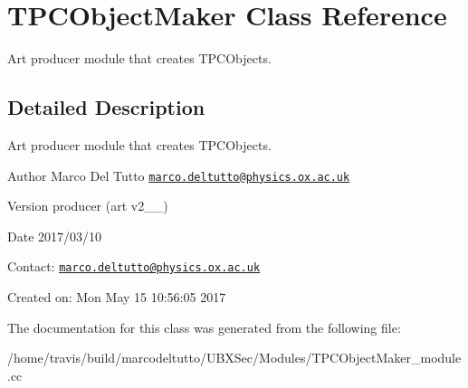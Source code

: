 \hypertarget{classTPCObjectMaker}{\section{T\-P\-C\-Object\-Maker Class Reference}
\label{classTPCObjectMaker}
}


Art producer module that creates T\-P\-C\-Objects.  




\subsection{Detailed Description}
Art producer module that creates T\-P\-C\-Objects. 

\begin{DoxyAuthor}{Author}
Marco Del Tutto \href{mailto:marco.deltutto@physics.ox.ac.uk}{\tt marco.\-deltutto@physics.\-ox.\-ac.\-uk}
\end{DoxyAuthor}
\begin{DoxyVersion}{Version}
producer (art v2\-\_\-\_)
\end{DoxyVersion}
\begin{DoxyDate}{Date}
2017/03/10
\end{DoxyDate}
Contact\-: \href{mailto:marco.deltutto@physics.ox.ac.uk}{\tt marco.\-deltutto@physics.\-ox.\-ac.\-uk}

Created on\-: Mon May 15 10\-:56\-:05 2017 

The documentation for this class was generated from the following file\-:\begin{DoxyCompactItemize}
\item 
/home/travis/build/marcodeltutto/\-U\-B\-X\-Sec/\-Modules/T\-P\-C\-Object\-Maker\-\_\-module.\-cc\end{DoxyCompactItemize}
